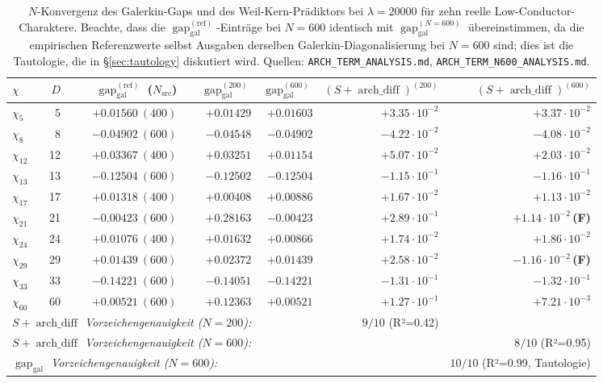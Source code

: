 \documentclass[10pt,twocolumn]{article}
\theoremstyle{definition}
\theoremstyle{remark}
\newcommand{\gap}{\operatorname{gap}}
\newcommand{\chifn}{\chi}
\newcommand{\archdiff}{\operatorname{arch\_diff}}
\begin{document}
\begin{table}[t]
\caption{$N$-Konvergenz des Galerkin-Gaps und des Weil-Kern-Prädiktors
  bei $\lambda=20000$ für zehn reelle Low-Conductor-Charaktere. Beachte, dass
  die $\gap_{\mathrm{gal}}^{(\mathrm{ref})}$-Einträge bei $N=600$ identisch mit
  $\gap_{\mathrm{gal}}^{(N=600)}$ übereinstimmen, da die empirischen Referenzwerte
  selbst Ausgaben derselben Galerkin-Diagonalisierung bei $N=600$ sind;
  dies ist die Tautologie, die in \S\ref{sec:tautology} diskutiert wird.
  Quellen: \texttt{ARCH\_TERM\_ANALYSIS.md}, \texttt{ARCH\_TERM\_N600\_ANALYSIS.md}.}
\label{tab:validation}
\centering
\small
\begin{tabular}{@{}lrrrrrr@{}}
\toprule
$\chifn$ & $D$ & $\gap_{\mathrm{gal}}^{(\mathrm{ref})}$ ($N_\mathrm{src}$) & $\gap_{\mathrm{gal}}^{(200)}$ & $\gap_{\mathrm{gal}}^{(600)}$ & $(S+\archdiff)^{(200)}$ & $(S+\archdiff)^{(600)}$ \\
\midrule
$\chi_5$  &  5 & $+0.01560\ (400)$ & $+0.01429$ & $+0.01603$ & $+3.35\!\cdot\!10^{-2}$ & $+3.37\!\cdot\!10^{-2}$ \\
$\chi_8$  &  8 & $-0.04902\ (600)$ & $-0.04548$ & $-0.04902$ & $-4.22\!\cdot\!10^{-2}$ & $-4.08\!\cdot\!10^{-2}$ \\
$\chi_{12}$ & 12 & $+0.03367\ (400)$ & $+0.03251$ & $+0.01154$ & $+5.07\!\cdot\!10^{-2}$ & $+2.03\!\cdot\!10^{-2}$ \\
$\chi_{13}$ & 13 & $-0.12504\ (600)$ & $-0.12502$ & $-0.12504$ & $-1.15\!\cdot\!10^{-1}$ & $-1.16\!\cdot\!10^{-1}$ \\
$\chi_{17}$ & 17 & $+0.01318\ (400)$ & $+0.00408$ & $+0.00886$ & $+1.67\!\cdot\!10^{-2}$ & $+1.13\!\cdot\!10^{-2}$ \\
$\chi_{21}$ & 21 & $-0.00423\ (600)$ & $\mathbf{+0.28163}$ & $-0.00423$ & $+2.89\!\cdot\!10^{-1}$ & $+1.14\!\cdot\!10^{-2}$\,\textbf{(F)} \\
$\chi_{24}$ & 24 & $+0.01076\ (400)$ & $+0.01632$ & $+0.00866$ & $+1.74\!\cdot\!10^{-2}$ & $+1.86\!\cdot\!10^{-2}$ \\
$\chi_{29}$ & 29 & $+0.01439\ (600)$ & $+0.02372$ & $+0.01439$ & $+2.58\!\cdot\!10^{-2}$ & $-1.16\!\cdot\!10^{-2}$\,\textbf{(F)} \\
$\chi_{33}$ & 33 & $-0.14221\ (600)$ & $-0.14051$ & $-0.14221$ & $-1.31\!\cdot\!10^{-1}$ & $-1.32\!\cdot\!10^{-1}$ \\
$\chi_{60}$ & 60 & $+0.00521\ (600)$ & $+0.12363$ & $+0.00521$ & $+1.27\!\cdot\!10^{-1}$ & $+7.21\!\cdot\!10^{-3}$ \\
\midrule
\multicolumn{4}{l}{\textit{$S+\archdiff$ Vorzeichengenauigkeit ($N=200$):}} & & $9/10$ (R²=0.42) & \\
\multicolumn{4}{l}{\textit{$S+\archdiff$ Vorzeichengenauigkeit ($N=600$):}} & & & $8/10$ (R²=0.95) \\
\multicolumn{4}{l}{\textit{$\gap_{\mathrm{gal}}$ Vorzeichengenauigkeit ($N=600$):}} & & & $10/10$ (R²=0.99, Tautologie) \\
\bottomrule
\end{tabular}
\end{table}
\end{document}
